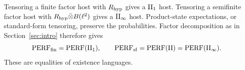 Tensoring a finite factor host with $R_{\rm hyp}$ gives a $\mathrm{II}_1$ host.
Tensoring a semifinite factor host with $R_{\rm hyp}\bar\otimes B(\ell^2)$ gives a
$\mathrm{II}_\infty$ host. Product-state expectations, or standard-form tensoring,
preserve the probabilities. Factor decomposition as in
Section~\ref{sec:intro} therefore gives
\begin{equation}\label{eq:languageequal}
 \mathrm{PERF}_{\mathrm{fin}}=\mathrm{PERF}(\mathrm{II}_1),\qquad
 \mathrm{PERF}_{\mathrm{sf}}=\mathrm{PERF}(\mathrm{II})=\mathrm{PERF}(\mathrm{II}_\infty).
\end{equation}
These are equalities of existence languages.
